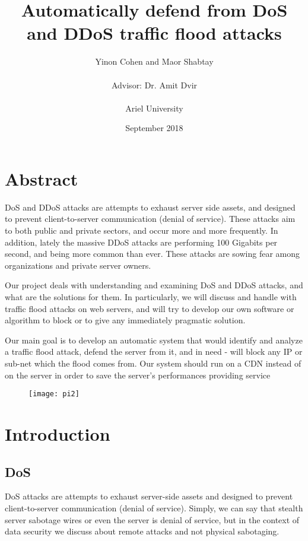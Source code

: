 \documentclass{report}
\title{Automatically defend from DoS and DDoS traffic flood attacks}
\author{Yinon Cohen and Maor Shabtay\\\\{ Advisor: Dr. Amit Dvir}\\\\{Ariel University}}
\date{September 2018}
\begin{document}
\maketitle
\tableofcontents
{}


\newpage

\chapter {Abstract}
\hfill \break \gls{DoS} and \gls{DDoS} attacks are attempts to exhaust server side assets, and designed to prevent client-to-server communication (denial of service). These attacks aim to both public and private sectors, and occur more and more frequently. In addition, lately the massive \gls{DDoS} attacks are performing 100 Gigabits per second, and being more common than ever. These attacks are sowing fear among organizations and private server owners.

\hfill \break Our project deals with understanding and examining \gls{DoS} and \gls{DDoS} attacks, and what are the solutions for them. In particularly, we will discuss and handle with traffic flood attacks on web servers, and will try to develop our own software or algorithm to block or to give any immediately pragmatic solution.

\hfill \break Our main goal is to develop an automatic system that would identify and analyze a traffic flood attack, defend the server from it, and in need - will block any \gls{IP} or sub-net which the flood comes from. Our system should run on a \gls{CDN} instead of on the server in order to save the server’s performances providing service
\hfill \break \hfill \break
\begin{figure}[h]
  \centering
        \texttt{[image: pi2]}
    \end{figure}
\newpage
\chapter {Introduction}
\section {DoS}
\hfill \break \gls{DoS} attacks are attempts to exhaust server-side assets and designed to prevent client-to-server communication (denial of service). Simply, we can say that stealth server sabotage wires or even the server is denial of service, but in the context of data security we discuss about remote attacks and not physical sabotaging.
\end{document}
